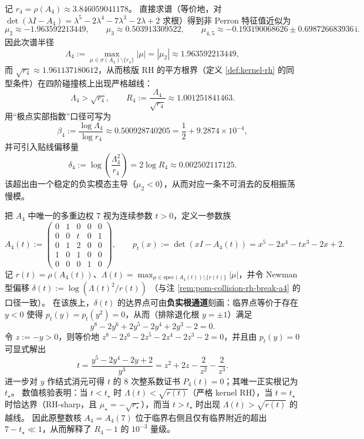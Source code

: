 \begin{remark}\label{rem:pom-collision-rh-break-a4-spectrum}
记 \(r_4=\rho(A_4)\approx 3.846059041178\)。
直接求谱（等价地，对 \(\det(\lambda I-A_4)=\lambda^5-2\lambda^4-7\lambda^3-2\lambda+2\) 求根）得到非 Perron 特征值近似为
\[
\mu_2\approx -1.963592213449,\qquad
\mu_3\approx 0.503913309522,\qquad
\mu_{4,5}\approx -0.193190068626\pm 0.698726683936\,\mathrm{i}.
\]
因此次谱半径
\[
\Lambda_4:=\max_{\mu\in\sigma(A_4)\setminus\{r_4\}}|\mu|
=|\mu_2|
\approx 1.963592213449,
\]
而
\(
\sqrt{r_4}\approx 1.961137180612
\)，从而核版 RH 的平方根界（定义 \ref{def:kernel-rh} 的同型条件）在四阶碰撞核上出现严格越线：
\[
\Lambda_4>\sqrt{r_4},\qquad
R_4:=\frac{\Lambda_4}{\sqrt{r_4}}\approx 1.001251841463.
\]
用“极点实部指数”口径可写为
\[
\beta_4:=\frac{\log \Lambda_4}{\log r_4}\approx 0.500928740205=\frac12+9.2874\times 10^{-4},
\]
并可引入贴线偏移量
\[
\delta_4:=\log\!\left(\frac{\Lambda_4^2}{r_4}\right)=2\log R_4\approx 0.002502117125.
\]
 该超出由一个稳定的负实模态主导（\(\mu_2<0\)），从而对应一条不可消去的反相振荡慢模。
\end{remark}

\begin{remark}\label{rem:pom-collision-rh-break-a4-threshold}
把 \(A_4\) 中唯一的多重边权 \(7\) 视为连续参数 \(t>0\)，定义一参数族
\[
A_4(t):=
\begin{pmatrix}
0&1&0&0&0\\
0&0&t&0&1\\
0&1&2&0&0\\
1&0&1&0&0\\
0&0&0&1&0
\end{pmatrix},
\qquad
p_t(x):=\det(xI-A_4(t))=x^5-2x^4-tx^3-2x+2.
\]
记 \(r(t)=\rho(A_4(t))\)、\(\Lambda(t)=\max_{\mu\in\mathrm{spec}(A_4(t))\setminus\{r(t)\}}|\mu|\)，并令 Newman 型偏移
\(
\delta(t):=\log(\Lambda(t)^2/r(t))
\)
（与注 \ref{rem:pom-collision-rh-break-a4} 的口径一致）。
在该族上，\(\delta(t)\) 的达界点可由\textbf{负实根通道}刻画：临界点等价于存在 \(y<0\) 使得 \(p_t(y)=p_t(y^2)=0\)，从而（排除退化根 \(y=\pm 1\)）满足
\[
y^8-2y^6+2y^5-2y^4+2y^3-2=0.
\]
令 \(z:=-y>0\)，则等价地
\(
z^8-2z^6-2z^5-2z^4-2z^3-2=0
\)，并且由 \(p_t(y)=0\) 可显式解出
\[
t=\frac{y^5-2y^4-2y+2}{y^3}
=z^2+2z-\frac{2}{z^2}-\frac{2}{z^3}.
\]
进一步对 \(y\) 作结式消元可得 \(t\) 的 8 次整系数证书 \(P_4(t)=0\)；其唯一正实根记为 \(t_\star\)。
数值核验表明：当 \(t<t_\star\) 时 \(\Lambda(t)<\sqrt{r(t)}\)（严格 kernel RH），当 \(t=t_\star\) 时恰达界（RH-sharp，且 \(\mu_\star=-\sqrt{r_\star}\)），而当 \(t>t_\star\) 时出现 \(\Lambda(t)>\sqrt{r(t)}\) 的越线。
 因此原整数核 \(A_4=A_4(7)\) 位于临界右侧且仅有临界附近的超出 \(7-t_\star\ll 1\)，从而解释了 \(R_4-1\) 的 \(10^{-3}\) 量级。
\end{remark}



